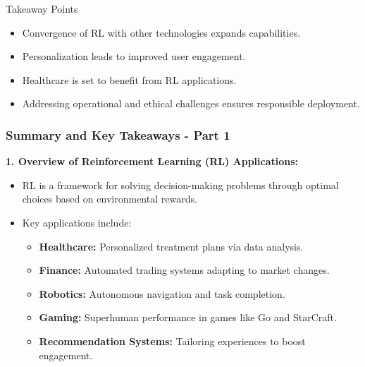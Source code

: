 \documentclass[aspectratio=169]{beamer}
\begin{document}
\begin{frame}[fragile]
    \begin{block}{Takeaway Points}
        \begin{itemize}
            \item Convergence of RL with other technologies expands capabilities.
            \item Personalization leads to improved user engagement.
            \item Healthcare is set to benefit from RL applications.
            \item Addressing operational and ethical challenges ensures responsible deployment.
        \end{itemize}
    \end{block}
\end{frame}

\begin{frame}[fragile]
  \frametitle{Summary and Key Takeaways - Part 1}
  
  \textbf{1. Overview of Reinforcement Learning (RL) Applications:}
  \begin{itemize}
      \item RL is a framework for solving decision-making problems through optimal choices based on environmental rewards.
      \item Key applications include:
      \begin{itemize}
          \item \textbf{Healthcare:} Personalized treatment plans via data analysis.
          \item \textbf{Finance:} Automated trading systems adapting to market changes.
          \item \textbf{Robotics:} Autonomous navigation and task completion.
          \item \textbf{Gaming:} Superhuman performance in games like Go and StarCraft.
          \item \textbf{Recommendation Systems:} Tailoring experiences to boost engagement.
      \end{itemize}
  \end{itemize}
\end{frame}
\end{document}
